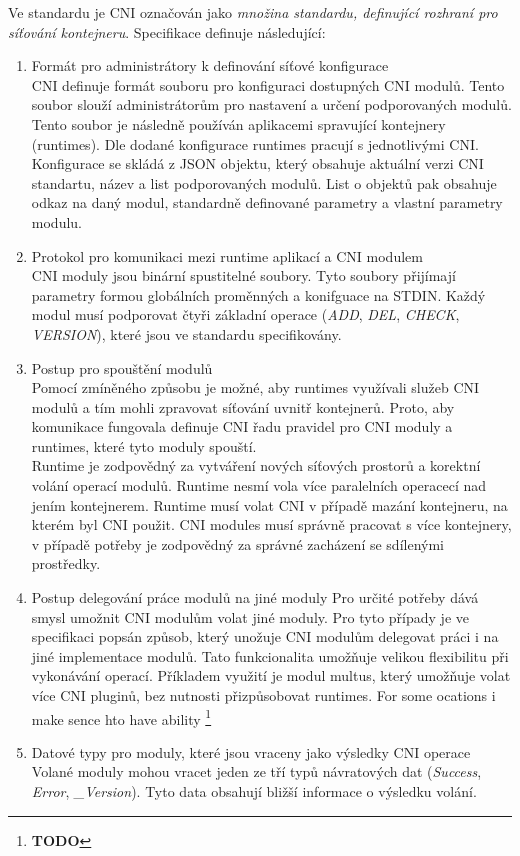 Ve standardu je CNI označován jako \textit{množina standardu, definující rozhraní pro síťování kontejneru}. Specifikace definuje následující:
\begin{enumerate}
    \item Formát pro administrátory k definování síťové konfigurace \\
    CNI definuje formát souboru pro konfiguraci dostupných CNI modulů. Tento soubor slouží administrátorům pro nastavení a určení podporovaných modulů. Tento soubor je následně používán aplikacemi spravující kontejnery (runtimes). Dle dodané konfigurace runtimes pracují s jednotlivými CNI. \\
    Konfigurace se skládá z JSON objektu, který obsahuje aktuální verzi CNI standartu, název a list podporovaných modulů. List o objektů pak obsahuje odkaz na daný modul, standardně definované parametry a vlastní parametry modulu.
    \item Protokol pro komunikaci mezi runtime aplikací a CNI modulem \\
    CNI moduly jsou binární spustitelné soubory. Tyto soubory přijímají parametry formou globálních proměnných a konifguace na STDIN. Každý modul musí podporovat čtyři základní operace (\textit{ADD}, \textit{DEL}, \textit{CHECK}, \textit{VERSION}), které jsou ve standardu specifikovány.
    \item Postup pro spouštění modulů \\
    Pomocí zmíněného způsobu je možné, aby runtimes využívali služeb CNI modulů a tím mohli zpravovat síťování uvnitř kontejnerů. Proto, aby komunikace fungovala definuje CNI řadu pravidel pro CNI moduly a runtimes, které tyto moduly spouští. \\
    Runtime je zodpovědný za vytváření nových síťových prostorů a korektní volání operací modulů. Runtime nesmí vola více paralelních operacecí nad jením kontejnerem. Runtime musí volat CNI v případě mazání kontejneru, na kterém byl CNI použit.
    CNI modules musí správně pracovat s více kontejnery, v případě potřeby je zodpovědný za správné zacházení se sdílenými prostředky. 
    \item Postup delegování práce modulů na jiné moduly
    Pro určité potřeby dává smysl umožnit CNI modulům volat jiné moduly. Pro tyto případy je ve specifikaci popsán způsob, který unožuje CNI modulům delegovat práci i na jiné implementace modulů. Tato funkcionalita umožňuje velikou flexibilitu při vykonávání operací. Příkladem využití je modul multus, který umožňuje volat více CNI pluginů, bez nutnosti přizpůsobovat runtimes.
    For some ocations i make sence hto have ability \footnote{\textbf{TODO}}
    \item Datové typy pro moduly, které jsou vraceny jako výsledky CNI operace
    Volané moduly mohou vracet jeden ze tří typů návratových dat (\textit{Success}, \textit{Error}, \textit{\_Version}). Tyto data obsahují bližší informace o výsledku volání.  
\end{enumerate}\cite{a2023_container}

